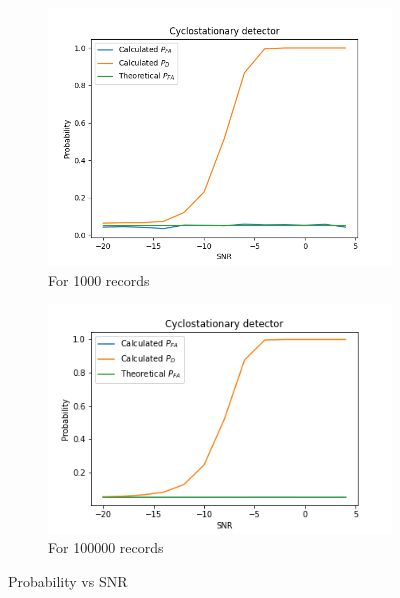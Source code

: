 \documentclass[a4 paper]{article}
\begin{document}
\begin{figure}[h]
	\centering
	\begin{subfigure}{.5\textwidth}
		\includegraphics[width=1\linewidth]{../results/cyclostationary_detector_b.png}
		\caption{For 1000 records}
		\label{fig:cyclo_b1}
	\end{subfigure}%
	\begin{subfigure}{.5\textwidth}
		\includegraphics[width=1.15\linewidth]{../results/cyclostationary_detector_b_ideal.png}
		\caption{For 100000 records}
		\label{fig:cyclo_b2}
	\end{subfigure}
	\caption{Probability vs SNR}
	\label{fig:cyclo_b}
\end{figure}


\vspace{-2em}
\vspace{-1em}
\end{document}
